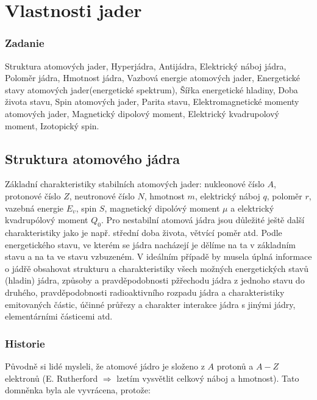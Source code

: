 \documentclass[../../main.tex]{subfiles}
\begin{document}
\chapter{Vlastnosti jader}

\subsection{Zadanie}

Struktura atomových jader, Hyperjádra, Antijádra, Elektrický náboj jádra, Poloměr jádra, Hmotnost jádra, Vazbová energie atomových jader, Energetické stavy atomových jader(energetické spektrum), Šířka energetické hladiny, Doba života stavu, Spin atomových jader, Parita stavu, Elektromagnetické momenty atomových jader, Magnetický dipolový moment, Elektrický kvadrupolový moment, Izotopický spin.

\section{Struktura atomového jádra}

Základní charakteristiky stabilních atomových jader: nukleonové číslo $A$, protonové číslo $Z$, neutronové číslo $N$, hmotnost $m$, elektrický náboj $q$, poloměr $r$, vazebná energie $E_v$, spin $S$, magnetický dipolóvý moment $\mu$ a elektrický kvadrupólový moment $Q_0$. Pro nestabilní atomová jádra jsou důležité ještě další charakteristiky jako je např. střední doba života, větvící poměr atd. Podle energetického stavu, ve kterém se jádra nacházejí je dělíme na ta v základním stavu a na ta ve stavu vzbuzeném. V ideálním případě by musela úplná informace o jádřě obsahovat strukturu a charakteristiky všech možných energetických stavů (hladin) jádra, způsoby a pravděpodobnosti pžřechodu jádra z jednoho stavu do druhého, pravděpodobnosti radioaktivního rozpadu jádra a charakteristiky emitovaných částic, účinné průřezy a charakter interakce jádra s jinými jádry, elementárními částicemi atd.

\subsection{Historie}

Původně si lidé mysleli, že atomové jádro je složeno z $A$ protonů a $A - Z$ elektronů (E. Rutherford $\Rightarrow$ lzetím vysvětlit celkový náboj a hmotnost). Tato domněnka byla ale vyvrácena, protože:
\end{document}
